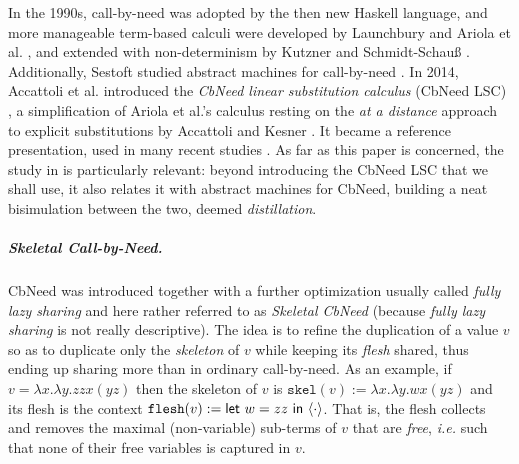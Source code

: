 \documentclass[10pt,a4paper]{article}
\theoremstyle{remark}
\newcommand{\la}[1]{\lambda #1.}
\newcommand{\var}{x}
\newcommand{\vartwo}{y}
\newcommand{\varthree}{z}
\newcommand{\varfour}{w}
\newcommand{\symfont}[1]{\mathtt{#1}}
\newcommand{\val}{v}
\newcommand{\ctxholep}[1]{\langle #1\rangle}
\newcommand{\ctxhole}{\ctxholep{\cdot}}
\newcommand{\defeq}{:=}
\newcommand{\ie}{{\em i.e.}\xspace}
\newcommand{\cbneed}{CbNeed\xspace}
\newcommand{\skelabs}[1]{\symfont{skel}(#1)}
\newcommand{\flesh}[1]{\symfont{flesh}(#1)}
\newcommand{\letin}[3]{{\sf let}\ #1=#2\ {\sf in}\ #3}
\begin{document}
In the 1990s, call-by-need was adopted by the then new Haskell language, and more manageable term-based calculi were developed by Launchbury \cite{DBLP:conf/popl/Launchbury93} and Ariola et al. \cite{DBLP:conf/popl/AriolaFMOW95}, and extended with non-determinism by Kutzner and Schmidt-Schau{\ss} \cite{DBLP:conf/icfp/KutznerS98}. 
Additionally, Sestoft studied abstract machines for call-by-need \cite{DBLP:journals/jfp/Sestoft97}. In 2014, Accattoli et al. introduced the \emph{\cbneed linear substitution calculus} (\cbneed LSC) \cite{DBLP:conf/icfp/AccattoliBM14}, a simplification of  Ariola et al.'s calculus resting on the \emph{at a distance} approach to explicit substitutions by Accattoli and Kesner \cite{DBLP:conf/csl/AccattoliK10}. It became a reference presentation, used in many recent studies \cite{DBLP:conf/fossacs/Kesner16,DBLP:journals/pacmpl/BalabonskiBBK17,DBLP:conf/ppdp/AccattoliB17,DBLP:conf/fossacs/KesnerRV18,DBLP:conf/ppdp/BarenbaumBM18,DBLP:conf/esop/AccattoliGL19,DBLP:journals/lmcs/KesnerPV24,DBLP:conf/fscd/BalabonskiLM21,DBLP:conf/csl/AccattoliL22,DBLP:conf/fscd/AccattoliL24}. As far as this paper is concerned, the study in \cite{DBLP:conf/icfp/AccattoliBM14} is particularly relevant: beyond introducing the \cbneed LSC that we shall use, it also relates it with abstract machines for \cbneed, building a neat bisimulation between the two, deemed \emph{distillation}.

\subparagraph{Skeletal Call-by-Need.} \cbneed was introduced together with a further optimization usually called \emph{fully lazy sharing} and here rather referred to as \emph{Skeletal \cbneed} (because \emph{fully lazy sharing} is not really descriptive). The idea is to refine the duplication of a value $\val$ so as to duplicate only the \emph{skeleton} of $\val$ while keeping its \emph{flesh} shared, thus ending up sharing more than in ordinary call-by-need. As an example, if $\val = \la\var\la\vartwo\varthree\varthree\var(\vartwo\varthree)$ then the skeleton of $\val$ is $\skelabs\val \defeq \la\var\la\vartwo\varfour\var(\vartwo\varthree)$ and its flesh is the context $\flesh\val \defeq \letin\varfour{\varthree\varthree}\ctxhole$. That is, the flesh collects and removes the maximal (non-variable) sub-terms of $\val$ that are \emph{free}, \ie such that none of their free variables is captured in $\val$.
\end{document}
